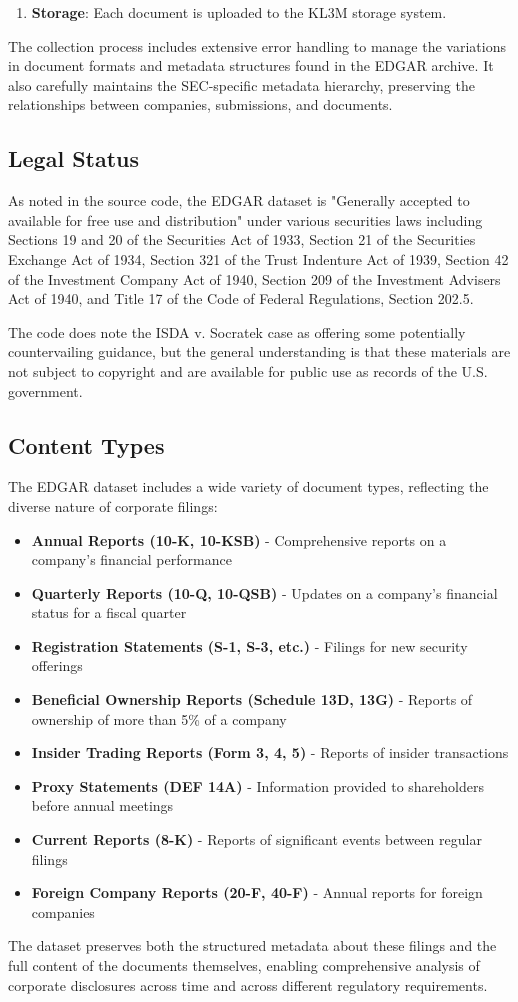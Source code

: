 \begin{enumerate}
  \item \textbf{Storage}: Each document is uploaded to the KL3M storage system.
\end{enumerate}

The collection process includes extensive error handling to manage the variations in document formats and metadata structures found in the EDGAR archive. It also carefully maintains the SEC-specific metadata hierarchy, preserving the relationships between companies, submissions, and documents.

\subsection{Legal Status}

As noted in the source code, the EDGAR dataset is "Generally accepted to available for free use and distribution" under various securities laws including Sections 19 and 20 of the Securities Act of 1933, Section 21 of the Securities Exchange Act of 1934, Section 321 of the Trust Indenture Act of 1939, Section 42 of the Investment Company Act of 1940, Section 209 of the Investment Advisers Act of 1940, and Title 17 of the Code of Federal Regulations, Section 202.5.

The code does note the ISDA v. Socratek case as offering some potentially countervailing guidance, but the general understanding is that these materials are not subject to copyright and are available for public use as records of the U.S. government.

\subsection{Content Types}

The EDGAR dataset includes a wide variety of document types, reflecting the diverse nature of corporate filings:

\begin{itemize}
  \item \textbf{Annual Reports (10-K, 10-KSB)} - Comprehensive reports on a company's financial performance
  \item \textbf{Quarterly Reports (10-Q, 10-QSB)} - Updates on a company's financial status for a fiscal quarter
  \item \textbf{Registration Statements (S-1, S-3, etc.)} - Filings for new security offerings
  \item \textbf{Beneficial Ownership Reports (Schedule 13D, 13G)} - Reports of ownership of more than 5\% of a company
  \item \textbf{Insider Trading Reports (Form 3, 4, 5)} - Reports of insider transactions
  \item \textbf{Proxy Statements (DEF 14A)} - Information provided to shareholders before annual meetings
  \item \textbf{Current Reports (8-K)} - Reports of significant events between regular filings
  \item \textbf{Foreign Company Reports (20-F, 40-F)} - Annual reports for foreign companies
\end{itemize}

The dataset preserves both the structured metadata about these filings and the full content of the documents themselves, enabling comprehensive analysis of corporate disclosures across time and across different regulatory requirements.

